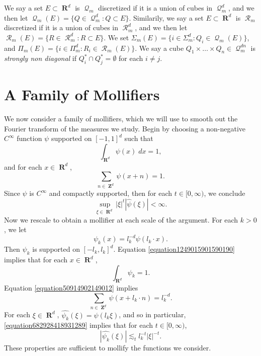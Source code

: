 \documentclass[12pt,reqno]{amsart}
\DeclareMathOperator{\RR}{\mathbf{R}}
\DeclareMathOperator{\ZZ}{\mathbf{Z}}
\DeclareMathOperator{\DQ}{\mathcal{Q}}
\DeclareMathOperator{\DR}{\mathcal{R}}
\begin{document}
We say a set $E \subset \RR^d$ is $\DQ_m$ discretized if it is a union of cubes in $\DQ_m^d$, and we then let $\DQ_m(E) = \{ Q \in \DQ_m^d : Q \subset E \}$. Similarily, we say a set $E \subset \RR^d$ is $\DR_m$ discretized if it is a union of cubes in $\DR_m^d$, and we then let $\DR_m(E) = \{ R \in \DR_m^d : R \subset E \}$. We set $\Sigma_m(E) = \{ i \in \Sigma_m^d : Q_i \in \DQ_m(E) \}$, and $\Pi_m(E) = \{ i \in \Pi_m^d : R_i \in \DR_m(E) \}$. We say a cube $Q_1 \times \dots \times Q_n \in \DQ_m^{dn}$ is \emph{strongly non diagonal} if $Q_i^* \cap Q_j^* = \emptyset$ for each $i \neq j$.

\section{A Family of Mollifiers}

We now consider a family of mollifiers, which we will use to smooth out the Fourier transform of the measures we study. Begin by choosing a non-negative $C^\infty$ function $\psi$ supported on $[-1,1]^d$ such that
%
\begin{equation} \label{equation1249015901590190}
	\int_{\RR^d} \psi(x)\; dx = 1,
\end{equation}
%
and for each $x \in \RR^d$,
%
\begin{equation} \label{equation50914902149012}
	\sum_{n \in \ZZ^d} \psi(x + n) = 1.
\end{equation}
%
Since $\psi$ is $C^\infty$ and compactly supported, then for each $t \in [0,\infty)$, we conclude
%
\begin{equation} \label{equation682928418931289}
	\sup_{\xi \in \RR^d} |\xi|^t |\widehat{\psi}(\xi)| < \infty.
\end{equation}
%
Now we rescale to obtain a mollifier at each scale of the argument. For each $k > 0$, we let
%
\[ \psi_k(x) = l_k^{-d} \psi(l_k \cdot x). \]
%
Then $\psi_k$ is supported on $[-l_k,l_k]^d$. Equation \eqref{equation1249015901590190} implies that for each $x \in \RR^d$,
%
\begin{equation} \label{equation19204910490190190}
	\int_{\RR^d} \psi_k = 1.
\end{equation}
%
Equation \eqref{equation50914902149012} implies
%
\begin{equation} \label{equation990249012409129041290} \sum_{n \in \ZZ^d} \psi(x + l_k \cdot n) = l_k^{-d}. \end{equation}
%
For each $\xi \in \RR^d$, $\widehat{\psi_k}(\xi) = \widehat{\psi}(l_k \xi)$, and so in particular, \eqref{equation682928418931289} implies that for each $t \in [0,\infty)$,
%
\begin{equation} \label{equation1094129041290}
	|\widehat{\psi_k}(\xi)| \lesssim_t l_k^{-t} |\xi|^{-t}.
\end{equation}
%
These properties are sufficient to mollify the functions we consider.
\end{document}
